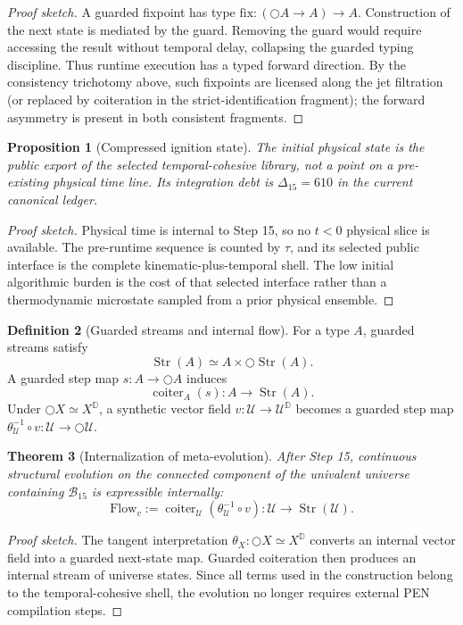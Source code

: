 \documentclass[11pt]{article}
\theoremstyle{plain}
\newtheorem{theorem}{Theorem}[section]
\newtheorem{proposition}[theorem]{Proposition}
\theoremstyle{definition}
\newtheorem{definition}[theorem]{Definition}
\theoremstyle{remark}
\newenvironment{proofsketch}{\begin{proof}[Proof sketch]}{\end{proof}}
\newcommand{\B}{\mathcal{B}}
\newcommand{\U}{\mathcal{U}}
\newcommand{\Str}{\operatorname{Str}}
\newcommand{\coiter}{\operatorname{coiter}}
\newcommand{\Next}{\bigcirc}
\newcommand{\D}{\mathbb{D}}
\begin{document}
\begin{proofsketch}
A guarded fixpoint has type \(\mathrm{fix}:(\Next A\to A)\to A\). Construction of the next state is mediated by the guard. Removing the guard would require accessing the result without temporal delay, collapsing the guarded typing discipline. Thus runtime execution has a typed forward direction. By the consistency trichotomy above, such fixpoints are licensed along the jet filtration (or replaced by coiteration in the strict-identification fragment); the forward asymmetry is present in both consistent fragments.
\end{proofsketch}

\begin{proposition}[Compressed ignition state]
The initial physical state is the public export of the selected temporal-cohesive library, not a point on a pre-existing physical time line. Its integration debt is \(\Delta_{15}=610\) in the current canonical ledger.
\end{proposition}

\begin{proofsketch}
Physical time is internal to Step 15, so no \(t<0\) physical slice is available. The pre-runtime sequence is counted by \(\tau\), and its selected public interface is the complete kinematic-plus-temporal shell. The low initial algorithmic burden is the cost of that selected interface rather than a thermodynamic microstate sampled from a prior physical ensemble.
\end{proofsketch}

\begin{definition}[Guarded streams and internal flow]
For a type \(A\), guarded streams satisfy
\[
\Str(A)\simeq A\times \Next\Str(A).
\]
A guarded step map \(s:A\to\Next A\) induces
\[
\coiter_A(s):A\to\Str(A).
\]
Under \(\Next X\simeq X^{\D}\), a synthetic vector field \(v:\U\to\U^{\D}\) becomes a guarded step map \(\theta_\U^{-1}\circ v:\U\to\Next\U\).
\end{definition}

\begin{theorem}[Internalization of meta-evolution]
After Step 15, continuous structural evolution on the connected component of the univalent universe containing \(\B_{15}\) is expressible internally:
\[
\mathrm{Flow}_v
:=
\coiter_\U(\theta_\U^{-1}\circ v):\U\to\Str(\U).
\]
\end{theorem}

\begin{proofsketch}
The tangent interpretation \(\theta_X:\Next X\simeq X^{\D}\) converts an internal vector field into a guarded next-state map. Guarded coiteration then produces an internal stream of universe states. Since all terms used in the construction belong to the temporal-cohesive shell, the evolution no longer requires external PEN compilation steps.
\end{proofsketch}
\end{document}
